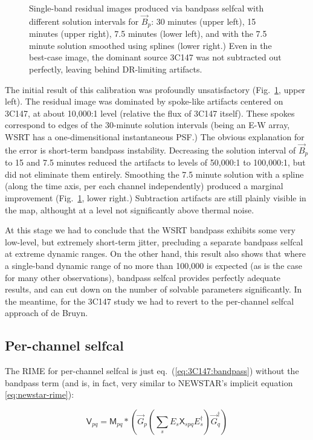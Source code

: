 \documentclass[]{aa}
\newcommand{\jones}[2]{\vec {#1}_{#2}}
\newcommand{\jonesT}[2]{\vec {#1}^\dagger_{#2}}
\newcommand{\coh}[2]{\mathsf{{#1}}_{{#2}}}
\begin{document}
\begin{figure}
\begin{centering}
\end{centering}
\caption{\label{fig:Bsol}Single-band residual images produced via bandpass selfcal with different solution intervals for $\jones{B}{p}$: 30 minutes (upper left), 15 minutes (upper right), 7.5 minutes (lower left), and with the 7.5 minute solution smoothed using splines (lower right.) Even in the best-case image, the dominant source 3C147 was not subtracted out perfectly, leaving behind DR-limiting artifacts.}
\end{figure}

The initial result of this calibration was profoundly unsatisfactory (Fig.~\ref{fig:Bsol}, upper left). The residual image was dominated by spoke-like artifacts centered on 3C147, at about 10,000:1 level (relative the flux of 3C147 itself). These spokes correspond to edges of the 30-minute solution intervals (being an E-W array, WSRT has a one-dimensitional instantaneous PSF.) The obvious explanation for the error is short-term bandpass instability. Decreasing the solution interval of $\jones{B}{p}$ to 15 and 7.5 minutes reduced the artifacts to levels of 50,000:1 to 100,000:1, but did not eliminate them entirely. Smoothing the 7.5 minute solution with a spline (along the time axis, per each channel independently) produced a marginal improvement (Fig.~\ref{fig:Bsol}, lower right.) Subtraction artifacts are still plainly visible in the map, althought at a level not significantly above thermal noise.

At this stage we had to conclude that the WSRT bandpass exhibits some very low-level, but extremely short-term jitter, precluding a separate bandpass selfcal at extreme dynamic ranges. On the other hand, this result also shows that where a single-band dynamic range of no more than 100,000 is expected (as is the case for many other observations), bandpass selfcal provides perfectly adequate results, and can cut down on the number of solvable parameters significantly. In the meantime, for the 3C147 study we had to revert to the per-channel selfcal approach of de Bruyn.

\subsection{Per-channel selfcal}

The RIME for per-channel selfcal is just eq.~(\ref{eq:3C147:bandpass}) without the bandpass term (and is, in fact, very similar to NEWSTAR's implicit equation \ref{eq:newstar-rime}):
 
\begin{equation}\label{eq:3C147:perchan}
\coh{V}{pq} = \coh{M}{pq} \ast \left ( \jones{G}{p} \left( \sum_s E_s \coh{X}{spq} E^{\dagger}_s \right)  \jonesT{G}{q} \right )
\end{equation}
\end{document}
